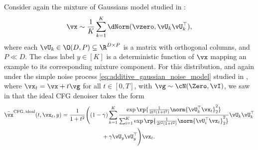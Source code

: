 \documentclass[../../book-main.tex]{subfiles}
\begin{document}
\begin{example}\label{example:denoising-gaussian-mixture-cfg-parameterization}
    Consider again the mixture of Gaussians model studied in
    :
    \begin{equation}
        \vx \sim \frac{1}{K}\sum_{k = 1}^{K}\dNorm(\vzero,
        \vU_{k}\vU_{k}^{\top}),
    \end{equation}
    where each \(\vU_{k} \in \O(D, P) \subseteq \R^{D \times P}\) is
    a matrix with
    orthogonal columns, and $P \ll D$.
    The class label $y \in [K]$ is a deterministic function of $\vx$ mapping an
    example to its corresponding mixture component.
    For this distribution,
    and again under the simple noise process
    \eqref{eq:additive_gaussian_noise_model} studied in ,
    where
    $\vx_t = \vx + t \vg$ for all $t \in [0, T]$, with $\vg \sim \cN(\Zero,
    \vI)$,
    we saw in 
    that the ideal CFG denoiser takes the form
    \begin{equation}\label{eq:cfg-denoiser-mog-low-rank-3}
        \begin{split}
            \bar{\vx}^{\mathrm{CFG,\,ideal}}(t, \vx_t, y)
            =
            \frac{1}{1 + t^{2}}
            \Biggl(
                &(1 - \gamma)
                \sum_{k = 1}^{K}\frac{\exp\rp{\frac{1}{2t^{2}(1
                + t^{2})}\norm{\vU_{k}^{\top}\vx_t}_{2}^{2}}}{\sum_{i
                    = 1}^{K}\exp\rp{\frac{1}{2t^{2}(1
                                +
                t^{2})}\norm{\vU_{i}^{\top}\vx_t}_{2}^{2}}}\vU_{k}\vU_{k}^{\top}
                \\
                &\qquad+
                \gamma
                \vU_{y}\vU_{y}^{\top}
            \Biggr)
            \vx_t.
        \end{split}
    \end{equation}


\end{example}
\end{document}
